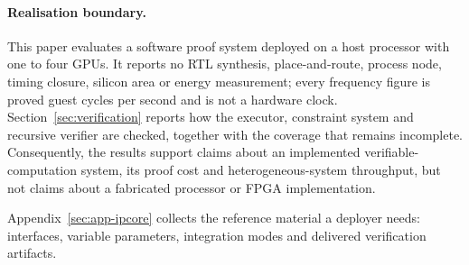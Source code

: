 \paragraph{Realisation boundary.} This paper evaluates a software proof system deployed on a host processor with one to four GPUs. It reports no RTL synthesis, place-and-route, process node, timing closure, silicon area or energy measurement; every frequency figure is proved guest cycles per second and is not a hardware clock. Section~\ref{sec:verification} reports how the executor, constraint system and recursive verifier are checked, together with the coverage that remains incomplete. Consequently, the results support claims about an implemented verifiable-computation system, its proof cost and heterogeneous-system throughput, but not claims about a fabricated processor or FPGA implementation.

Appendix~\ref{sec:app-ipcore} collects the reference material a deployer needs: interfaces, variable parameters, integration modes and delivered verification artifacts.
